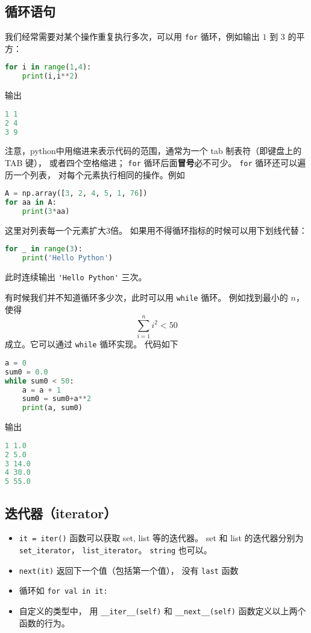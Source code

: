 \subsection{循环语句}
我们经常需要对某个操作重复执行多次，可以用 \verb|for| 循环，例如输出 $1$ 到 $3$ 的平方：
\begin{lstlisting}[language=python]
for i in range(1,4):
    print(i,i**2)
\end{lstlisting}
输出
\begin{lstlisting}[language=python]
1 1
2 4
3 9
\end{lstlisting}
注意，python中用缩进来表示代码的范围，通常为一个 tab 制表符（即键盘上的 TAB 键）， 或者四个空格缩进； \verb|for| 循环后面\textbf{冒号}必不可少。 \verb|for| 循环还可以遍历一个列表， 对每个元素执行相同的操作。例如
\begin{lstlisting}[language=python]
A = np.array([3, 2, 4, 5, 1, 76])
for aa in A:
    print(3*aa)
\end{lstlisting}
这里对列表每一个元素扩大3倍。 如果用不得循环指标的时候可以用下划线代替：
\begin{lstlisting}[language=python]
for _ in range(3):
    print('Hello Python')
\end{lstlisting}
此时连续输出   \verb|'Hello Python'|  三次。

有时候我们并不知道循环多少次，此时可以用 \verb|while| 循环。 例如找到最小的 $n$，使得
\begin{equation}
\sum_{i=1}^n i^2<50
\end{equation}
成立。它可以通过 \verb|while| 循环实现。 代码如下
\begin{lstlisting}[language=python]
a = 0
sum0 = 0.0
while sum0 < 50:
    a = a + 1
    sum0 = sum0+a**2
    print(a, sum0)
\end{lstlisting}
输出
\begin{lstlisting}[language=python]
1 1.0
2 5.0
3 14.0
4 30.0
5 55.0
\end{lstlisting}

\subsection{迭代器（iterator）}
\begin{itemize}
\item \verb|it = iter()| 函数可以获取 set, list 等的迭代器。 set 和 list 的迭代器分别为 \verb|set_iterator|， \verb|list_iterator|。 \verb|string| 也可以。
\item \verb|next(it)| 返回下一个值（包括第一个值）， 没有 \verb|last| 函数
\item 循环如 \verb|for val in it:|
\item 自定义的类型中， 用 \verb|__iter__(self)| 和 \verb|__next__(self)| 函数定义以上两个函数的行为。
\end{itemize}
